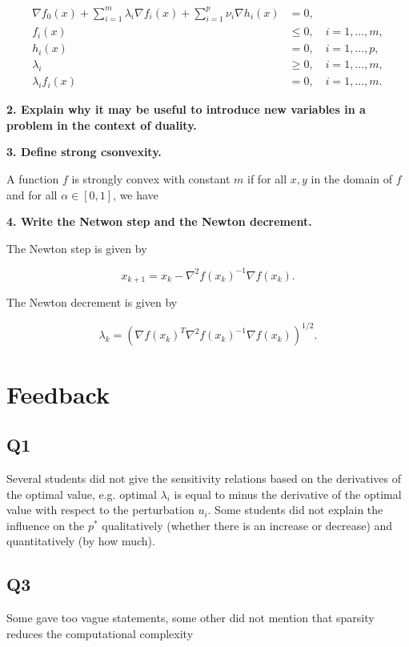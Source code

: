 $$
\begin{aligned}
\nabla f_0(x) + \sum_{i=1}^m \lambda_i \nabla f_i(x) + \sum_{i=1}^p \nu_i \nabla h_i(x) &= 0, \\
f_i(x) &\leq 0, \quad i = 1, \ldots, m, \\
h_i(x) &= 0, \quad i = 1, \ldots, p, \\
\lambda_i &\geq 0, \quad i = 1, \ldots, m, \\
\lambda_i f_i(x) &= 0, \quad i = 1, \ldots, m.
\end{aligned}
$$

\noindent\textbf{2. \; Explain why it may be useful to introduce new variables in a problem in the context of duality.}



\noindent\textbf{3. \; Define strong csonvexity.}

A function $f$ is strongly convex with constant $m$ if for all $x, y$ in the domain of $f$ and for all $\alpha \in [0, 1]$, we have

\noindent\textbf{4. \; Write the Netwon step and the Newton decrement.}

The Newton step is given by

$$
x_{k+1} = x_k - \nabla^2 f(x_k)^{-1} \nabla f(x_k).
$$

The Newton decrement is given by

$$
\lambda_k = \left( \nabla f(x_k)^T \nabla^2 f(x_k)^{-1} \nabla f(x_k) \right)^{1/2}.
$$

\newpage

\section*{Feedback}

\subsection*{Q1}

Several students did not give the sensitivity relations based on the derivatives of the optimal value, e.g. optimal $\lambda_i$ is equal to minus the derivative of the optimal value with respect to the perturbation $u_i$. Some students did not explain the influence on the $p^*$ qualitatively (whether there is an increase or decrease) and quantitatively (by how much).

\subsection*{Q3}
Some gave too vague statements, some other did not mention that sparsity reduces the computational complexity

